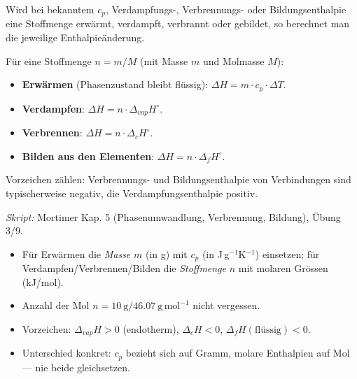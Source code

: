 

Wird bei bekanntem $c_p$, Verdampfungs-, Verbrennungs- oder
Bildungsenthalpie eine Stoffmenge erwärmt, verdampft, verbrannt oder gebildet,
so berechnet man die jeweilige Enthalpieänderung.

\begin{werkzeugkasten}
Für eine Stoffmenge $n = m/M$ (mit Masse $m$ und Molmasse $M$):
\begin{itemize}
  \item \textbf{Erwärmen} (Phasenzustand bleibt flüssig):
        $\Delta H = m\cdot c_p\cdot \Delta T$.
  \item \textbf{Verdampfen}: $\Delta H = n\cdot \Delta_{vap}H^\circ$.
  \item \textbf{Verbrennen}: $\Delta H = n\cdot \Delta_cH^\circ$.
  \item \textbf{Bilden aus den Elementen}: $\Delta H = n\cdot \Delta_fH^\circ$.
\end{itemize}
Vorzeichen zählen: Verbrennungs- und Bildungsenthalpie von Verbindungen sind
typischerweise negativ, die Verdampfungsenthalpie positiv.

\textit{Skript:} Mortimer Kap. 5 (Phasenumwandlung, Verbrennung, Bildung),
Übung 3/9.
\end{werkzeugkasten}

\begin{achtung}
\begin{itemize}
  \item Für Erwärmen die \emph{Masse} $m$ (in g) mit $c_p$ (in J\,g$^{-1}$K$^{-1}$)
        einsetzen; für Verdampfen/Verbrennen/Bilden die \emph{Stoffmenge}
        $n$ mit molaren Grössen (kJ/mol).
  \item Anzahl der Mol $n = 10\ \mathrm{g} / 46.07\
        \mathrm{g\,mol^{-1}}$ nicht vergessen.
  \item Vorzeichen: $\Delta_{vap}H > 0$ (endotherm), $\Delta_cH < 0$,
        $\Delta_fH(\text{flüssig}) < 0$.
  \item Unterschied konkret: $c_p$ bezieht sich auf Gramm, molare Enthalpien
        auf Mol --- nie beide gleichsetzen.
\end{itemize}
\end{achtung}
